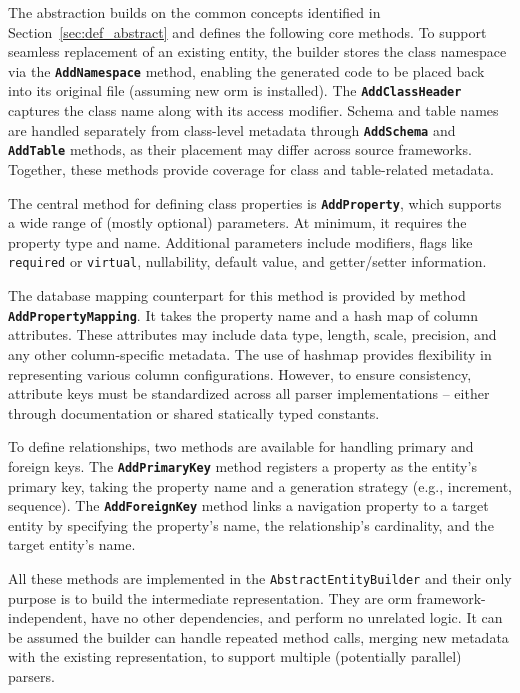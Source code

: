 The abstraction builds on the common concepts identified in Section~\ref{sec:def_abstract} and defines the following core methods. To support seamless replacement of an existing entity, the builder stores the class namespace via the \texttt{\textbf{AddNamespace}} method, enabling the generated code to be placed back into its original file (assuming new \acrshort{orm} is installed). The \texttt{\textbf{AddClassHeader}} captures the class name along with its access modifier. 
Schema and table names are handled separately from class-level metadata through \texttt{\textbf{AddSchema}} and \texttt{\textbf{AddTable}} methods, as their placement may differ across source frameworks. Together, these methods provide coverage for class and table-related metadata. 

The central method for defining class properties is \texttt{\textbf{AddProperty}}, which supports a wide range of (mostly optional) parameters. At minimum, it requires the property type and name. Additional parameters include modifiers, flags like \texttt{required} or \texttt{virtual}, nullability, default value, and getter/setter information. 

The database mapping counterpart for this method is provided by method \texttt{\textbf{AddPropertyMapping}}. It takes the property name and a hash map of column attributes. These attributes may include data type, length, scale, precision, and any other column-specific metadata. The use of hashmap provides flexibility in representing various column configurations. However, to ensure consistency, attribute keys must be standardized across all parser implementations -- either through documentation or shared statically typed constants.

To define relationships, two methods are available for handling primary and foreign keys. The \texttt{\textbf{AddPrimaryKey}} method registers a property as the entity’s primary key, taking the property name and a generation strategy (e.g., increment, sequence). The \texttt{\textbf{AddForeignKey}} method links a navigation property to a target entity by specifying the property's name, the relationship's cardinality, and the target entity's name.

All these methods are implemented in the \texttt{AbstractEntityBuilder} and their only purpose is to build the intermediate representation. They are \acrshort{orm} framework-independent, have no other dependencies, and perform no unrelated logic. It can be assumed the builder can handle repeated method calls, merging new metadata with the existing representation, to support multiple (potentially parallel) parsers. 

